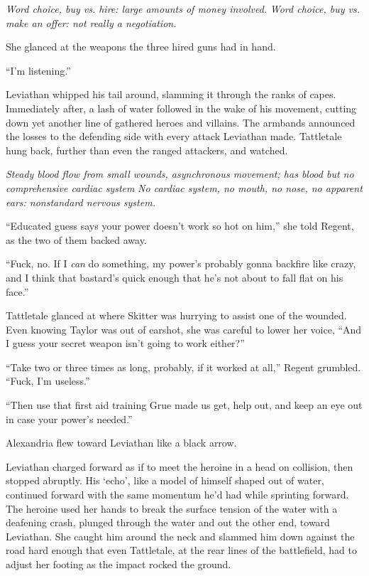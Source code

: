 \emph{Word choice, buy vs. hire: large amounts of money involved.}\emph{ Word choice, buy vs. make an offer: not really a negotiation.}



She glanced at the weapons the three hired guns had in hand.



``I'm listening.''



\blacksquare



Leviathan whipped his tail around, slamming it through the ranks of capes.  Immediately after, a lash of water followed in the wake of his movement, cutting down yet another line of gathered heroes and villains.  The armbands announced the losses to the defending side with every attack Leviathan made.  Tattletale hung back, further than even the ranged attackers, and watched.



\emph{Steady blood flow from small wounds, asynchronous movement; has blood but no comprehensive cardiac system}\emph{ No cardiac system, no mouth, no nose, no apparent ears: nonstandard nervous system.}



``Educated guess says your power doesn't work so hot on him,'' she told Regent, as the two of them backed away.



``Fuck, no.  If I \emph{can} do something, my power's probably gonna backfire like crazy, and I think that bastard's quick enough that he's not about to fall flat on his face.''



Tattletale glanced at where Skitter was hurrying to assist one of the wounded.  Even knowing Taylor was out of earshot, she was careful to lower her voice, ``And I guess your secret weapon isn't going to work either?''



``Take two or three times as long, probably, if it worked at all,'' Regent grumbled.  ``Fuck, I'm useless.''



``Then use that first aid training Grue made us get, help out, and keep an eye out in case your power's needed.''



Alexandria flew toward Leviathan like a black arrow.



Leviathan charged forward as if to meet the heroine in a head on collision, then stopped abruptly.  His `echo', like a model of himself shaped out of water, continued forward with the same momentum he'd had while sprinting forward.  The heroine used her hands to break the surface tension of the water with a deafening crash, plunged through the water and out the other end, toward Leviathan.  She caught him around the neck and slammed him down against the road hard enough that even Tattletale, at the rear lines of the battlefield, had to adjust her footing as the impact rocked the ground.



